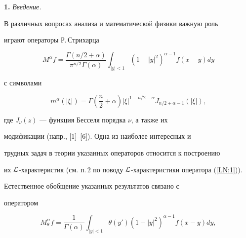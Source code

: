 \date{}




\pagestyle{plain} %







\maketitle


\label{begin}








{\bf 1.} {\it Введение.}


В различных вопросах анализа и математической физики важную роль


играют операторы Р.\,Стрихарца


\begin{equation}\label{LN:1}


M^\alpha f=\frac{\Gamma (n/2+\alpha)}


{\pi^{n/2}\Gamma(\alpha)}


\int_{|y|<1}(1-|y|^2)^{\alpha-1}f(x-y)dy


\end{equation}


с символами


$$


m^\alpha(|\xi|)=\Gamma\left(\frac n2+\alpha\right)


|\xi|^{1-n/2-\alpha} J_{n/2+\alpha-1}(|\xi|),


$$


где $J_\nu(z)$ --- функция Бесселя порядка $\nu$, а также их


модификации (напр., [1]--[6]). Одна из наиболее интересных и


трудных задач в теории указанных операторов относится к построению


их $\cal L$-характеристик (см. п.\,2 по поводу $\cal


L$-характеристики оператора (\ref{LN:1})).





Естественное обобщение указанных результатов связано с


оператором


\begin{equation}\label{LN:3}


M_\theta^\alpha f= \frac{1}{\Gamma(\alpha)} \int_{|y|<1}


\theta(y')(1-|y|^2)^{\alpha-1}f(x-y)dy,


\end{equation}


